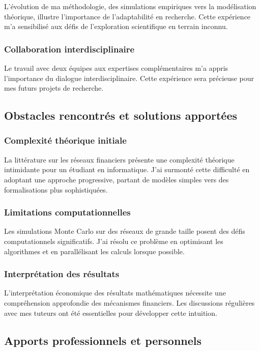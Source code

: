 \documentclass[12pt,a4paper,twoside]{article}
\begin{document}
L'évolution de ma méthodologie, des simulations empiriques vers la modélisation théorique, illustre l'importance de l'adaptabilité en recherche. Cette expérience m'a sensibilisé aux défis de l'exploration scientifique en terrain inconnu.

\subsubsection{Collaboration interdisciplinaire}

Le travail avec deux équipes aux expertises complémentaires m'a appris l'importance du dialogue interdisciplinaire. Cette expérience sera précieuse pour mes futurs projets de recherche.

\subsection{Obstacles rencontrés et solutions apportées}

\subsubsection{Complexité théorique initiale}

La littérature sur les réseaux financiers présente une complexité théorique intimidante pour un étudiant en informatique. J'ai surmonté cette difficulté en adoptant une approche progressive, partant de modèles simples vers des formalisations plus sophistiquées.

\subsubsection{Limitations computationnelles}

Les simulations Monte Carlo sur des réseaux de grande taille posent des défis computationnels significatifs. J'ai résolu ce problème en optimisant les algorithmes et en parallélisant les calculs lorsque possible.

\subsubsection{Interprétation des résultats}

L'interprétation économique des résultats mathématiques nécessite une compréhension approfondie des mécanismes financiers. Les discussions régulières avec mes tuteurs ont été essentielles pour développer cette intuition.

\subsection{Apports professionnels et personnels}
\end{document}
